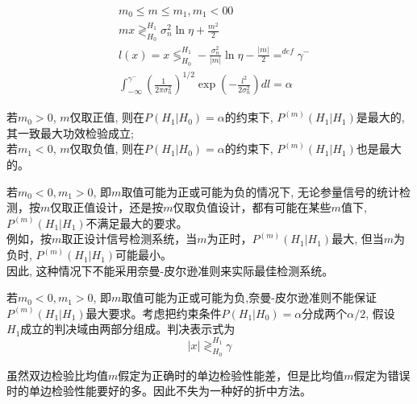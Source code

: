 \begin{frame}
\begin{align*}
&m_0\le m\le m_1,m_1<00\\
&mx\mathop{\gtrless}_{H_0}^{H_1}\sigma_n^2\ln\eta+\frac{m^2}{2}\\
&l(x)=x\mathop{\lessgtr}_{H_0}^{H_1}-\frac{\sigma_n^2}{|m|}\ln\eta-\frac{|m|}{2}\mathop{=}^{def}\gamma^-\\
&\int_{-\infty}^{\gamma^-}(\frac{1}{2\pi\sigma_n^2})^{1/2}\exp(-\frac{l^2}{2\sigma_n^2})dl=\alpha
\end{align*}
\end{frame}

\begin{frame}
若$m_0>0$, $m$仅取正值, 则在$P(H_1|H_0)=\alpha$的约束下, $P^{(m)}(H_1|H_1)$是最大的,其一致最大功效检验成立;\\
若$m_1<0$, $m$仅取负值, 则在$P(H_1|H_0)=\alpha$的约束下, $P^{(m)}(H_1|H_1)$也是最大的。
\end{frame}

\begin{frame}
若$m_0<0,m_1>0$, 即$m$取值可能为正或可能为负的情况下, 无论参量信号的统计检测，按$m$仅取正值设计，还是按$m$仅取负值设计，都有可能在某些$m$值下,   $P^{(m)}(H_1|H_1)$不满足最大的要求。\\
例如，按$m$取正设计信号检测系统，当$m$为正时，$P^{(m)}(H_1|H_1)$最大, 但当$m$为负时, $P^{(m)}(H_1|H_1)$可能最小。\\
因此, 这种情况下不能采用奈曼-皮尔逊准则来实际最佳检测系统。
\end{frame}

\begin{frame}
若$m_0<0,m_1>0$, 即$m$取值可能为正或可能为负,奈曼-皮尔逊准则不能保证$P^{(m)}(H_1|H_1)$最大要求。考虑把约束条件$P(H_1|H_0)=\alpha$分成两个$\alpha/2$, 假设$H_1成立$的判决域由两部分组成。判决表示式为
	\[|x|\mathop{\gtrless}_{H_0}^{H_1}\gamma \]

\begin{block}{}
	虽然双边检验比均值$m$假定为正确时的单边检验性能差，但是比均值$m$假定为错误时的单边检验性能要好的多。因此不失为一种好的折中方法。
\end{block}
\end{frame}


